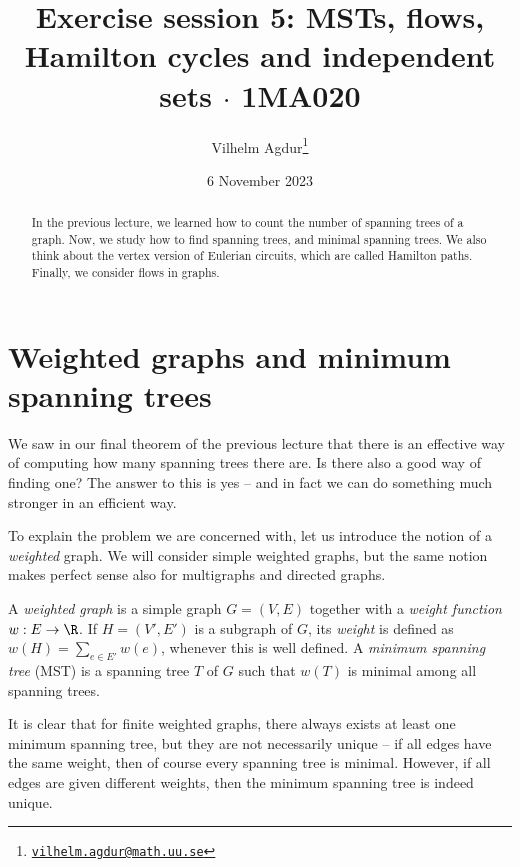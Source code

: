 \documentclass[nobib]{tufte-handout}
\title{Exercise session 5: MSTs, flows, Hamilton cycles and independent sets $\cdot$ 1MA020}
\author[Vilhelm Agdur]{Vilhelm Agdur\thanks{\href{mailto:vilhelm.agdur@math.uu.se}{\nolinkurl{vilhelm.agdur@math.uu.se}}}}
\date{6 November 2023}
\begin{document}
\maketitle%

\begin{abstract}
\noindent
In the previous lecture, we learned how to count the number of spanning trees of a graph. Now, we study how to find spanning trees, and minimal spanning trees. We also think about the vertex version of Eulerian circuits, which are called Hamilton paths. Finally, we consider flows in graphs.
\end{abstract}

\section{Weighted graphs and minimum spanning trees}

We saw in our final theorem of the previous lecture that there is an effective way of computing how many spanning trees there are. Is there also a good way of finding one? The answer to this is yes -- and in fact we can do something much stronger in an efficient way.

To explain the problem we are concerned with, let us introduce the notion of a \emph{weighted} graph. We will consider simple weighted graphs, but the same notion makes perfect sense also for multigraphs and directed graphs.

\begin{definition}
    A \emph{weighted graph} is a simple graph $G = (V,E)$ together with a \emph{weight function} $w: E \to \R$. If $H = (V', E')$ is a subgraph of $G$, its \emph{weight} is defined as $w(H) = \sum_{e\in E'} w(e)$, whenever this is well defined. A \emph{minimum spanning tree} (MST) is a spanning tree $T$ of $G$ such that $w(T)$ is minimal among all spanning trees.
\end{definition}

It is clear that for finite weighted graphs, there always exists at least one minimum spanning tree, but they are not necessarily unique -- if all edges have the same weight, then of course every spanning tree is minimal. However, if all edges are given different weights, then the minimum spanning tree is indeed unique.
\end{document}

